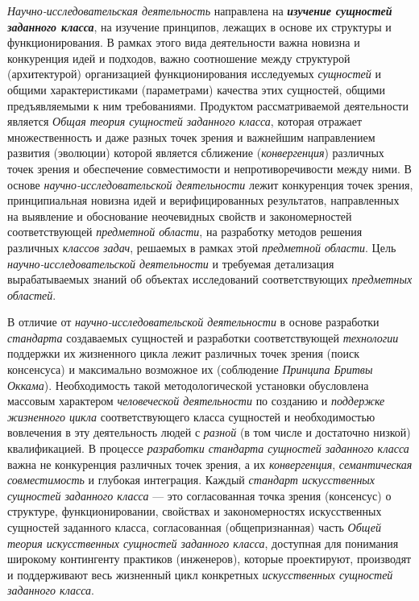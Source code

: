 \textit{Научно-исследовательская деятельность} направлена на \textbf{\textit{изучение сущностей заданного класса}}, на изучение принципов, лежащих в основе их структуры и функционирования. В рамках этого вида деятельности важна новизна и конкуренция идей и подходов, важно соотношение между структурой (архитектурой) организацией функционирования исследуемых \textit{сущностей} и общими характеристиками (параметрами) качества этих сущностей, общими предъявляемыми к ним требованиями. Продуктом рассматриваемой деятельности является \textit{Общая теория сущностей заданного класса}, которая отражает множественность и даже  разных точек зрения и важнейшим направлением развития (эволюции) которой является сближение (\textit{конвергенция}) различных точек зрения и обеспечение совместимости и непротиворечивости между ними. В основе \textit{научно-исследовательской деятельности} лежит конкуренция точек зрения, принципиальная новизна идей и верифицированных результатов, направленных на выявление и обоснование неочевидных свойств и закономерностей соответствующей \textit{предметной области}, на разработку методов решения различных \textit{классов задач}, решаемых в рамках этой \textit{предметной области}. Цель \textit{научно-исследовательской деятельности} и требуемая детализация вырабатываемых знаний об объектах исследований соответствующих \textit{предметных областей}.

В отличие от \textit{научно-исследовательской деятельности} в основе разработки \textit{стандарта} создаваемых сущностей и разработки соответствующей \textit{технологии} поддержки их жизненного цикла лежит  различных точек зрения (поиск консенсуса) и максимально возможное их  (соблюдение \textit{Принципа Бритвы Оккама}). Необходимость такой методологической установки обусловлена массовым характером \textit{человеческой деятельности} по созданию и \textit{поддержке жизненного цикла} соответствующего класса сущностей и необходимостью вовлечения в эту деятельность людей с \textit{разной} (в том числе и достаточно низкой) квалификацией. В процессе \textit{разработки стандарта сущностей заданного класса} важна не конкуренция различных точек зрения, а их \textit{конвергенция}, \textit{семантическая совместимость} и глубокая интеграция. Каждый \textit{стандарт} \textit{искусственных сущностей заданного класса} --- это согласованная  точка зрения (консенсус) о структуре, функционировании, свойствах и закономерностях искусственных сущностей заданного класса, согласованная (общепризнанная) часть \textit{Общей теория искусственных сущностей заданного класса}, доступная для понимания широкому контингенту практиков (инженеров), которые проектируют, производят и поддерживают весь жизненный цикл конкретных \textit{искусственных сущностей заданного класса}.

